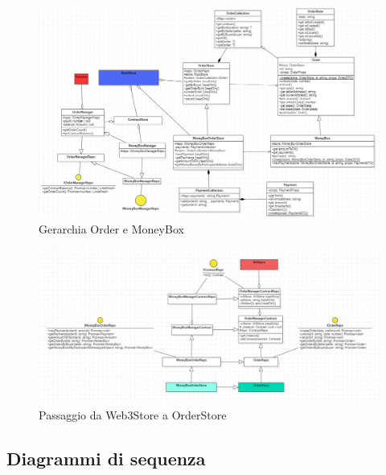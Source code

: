 \begin{landscape}
    \begin{figure}[H]
        \begin{center}
        \includegraphics[scale=0.7]{immagini/order_moneybox.png}
        \caption{Gerarchia Order e MoneyBox}
        \end{center}
    \end{figure}
\end{landscape}

\begin{landscape}
    \begin{figure}[H]
        \begin{center}
        \includegraphics[scale=0.7]{immagini/contractrepo.png}
        \caption{Passaggio da Web3Store a OrderStore}
        \end{center}
    \end{figure}
\end{landscape}
    
\subsection{Diagrammi di sequenza}

